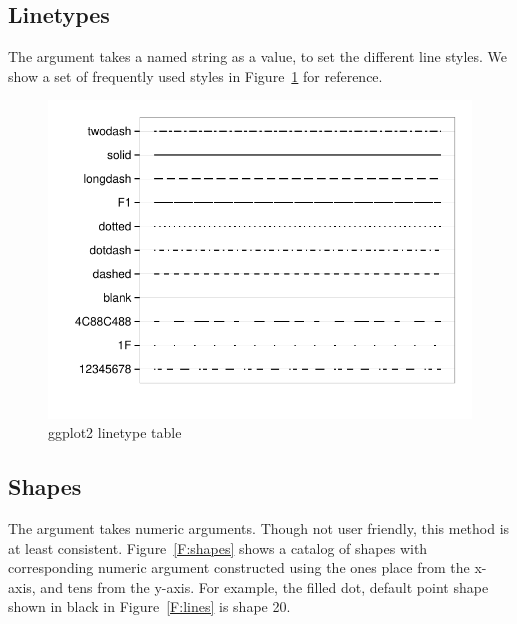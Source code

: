 \documentclass[nojss, letterpaper]{jss}\usepackage[]{graphicx}\usepackage[]{color}
\makeatletter
\def\maxwidth{ %
  \ifdim\Gin@nat@width>\linewidth
    \linewidth
  \else
    \Gin@nat@width
  \fi
}
\newenvironment{knitrout}{}{} %
\makeatother
\begin{document}
\subsection{Linetypes}\label{S:linetypes}
The  argument takes a named string as a value, to set the different line styles. We show a set of frequently used styles in Figure~\ref{F:linetypes} for reference.
\begin{knitrout}\footnotesize
{}\color{fgcolor}\begin{figure}[htpb]


{\centering \includegraphics[width=\maxwidth]{figure/beamer-linetypes} 

}

\caption[ggplot2 linetype table]{ggplot2 linetype table\label{F:linetypes}}
\end{figure}


\end{knitrout}

\subsection{Shapes}\label{S:shapes}
The  argument takes numeric arguments. Though not user friendly, this method is at least consistent. Figure~\ref{F:shapes} shows a catalog of shapes with corresponding numeric argument constructed using the ones place from the x-axis, and tens from the y-axis. For example, the filled dot, default point shape shown in black in Figure~\ref{F:lines} is shape 20.
\end{document}
